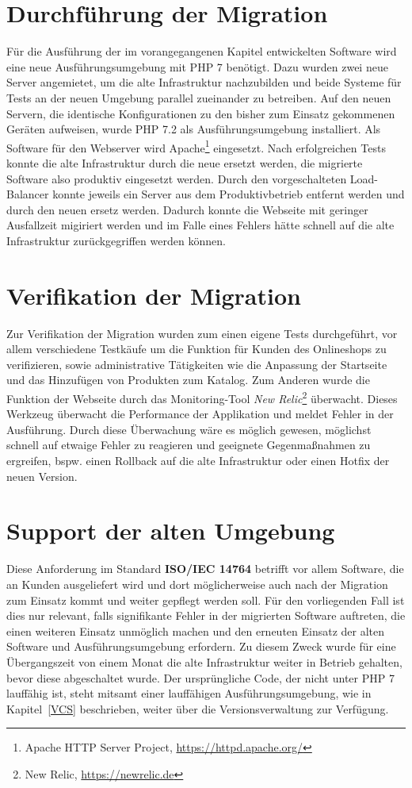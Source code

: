 \section{Durchführung der Migration}
Für die Ausführung der im vorangegangenen Kapitel entwickelten Software wird eine neue Ausführungsumgebung mit \ac{PHP} 7 benötigt. Dazu wurden zwei neue 
Server angemietet, um die alte Infrastruktur nachzubilden und beide Systeme für Tests an der neuen Umgebung parallel zueinander zu betreiben. Auf den neuen 
Servern, die identische Konfigurationen zu den bisher zum Einsatz gekommenen Geräten aufweisen, wurde \ac{PHP} 7.2 als Ausführungsumgebung installiert. 
Als Software für den Webserver wird Apache\footnote{Apache HTTP Server Project, \url{https://httpd.apache.org/}} eingesetzt. Nach erfolgreichen Tests konnte die 
alte Infrastruktur durch die neue ersetzt werden, die migrierte Software also produktiv eingesetzt werden. Durch den vorgeschalteten Load-Balancer konnte jeweils 
ein Server aus dem Produktivbetrieb entfernt werden und durch den neuen ersetz werden. Dadurch konnte die Webseite mit geringer Ausfallzeit migiriert werden und 
im Falle eines Fehlers hätte schnell auf die alte Infrastruktur zurückgegriffen werden können.

\section{Verifikation der Migration}\label{newrelic}
Zur Verifikation der Migration wurden zum einen eigene Tests durchgeführt, vor allem verschiedene Testkäufe um die Funktion für Kunden des Onlineshops zu verifizieren, 
sowie administrative Tätigkeiten wie die Anpassung der Startseite und das Hinzufügen von Produkten zum Katalog. Zum Anderen wurde die Funktion der Webseite durch das 
Monitoring-Tool \textit{New Relic}\footnote{New Relic, \url{https://newrelic.de}} überwacht. Dieses Werkzeug überwacht die Performance der Applikation und meldet Fehler 
in der Ausführung. Durch diese Überwachung wäre es möglich gewesen, möglichst schnell auf etwaige Fehler zu reagieren und geeignete 
Gegenmaßnahmen zu ergreifen, bspw. einen Rollback auf die alte Infrastruktur oder einen Hotfix der neuen Version.

\section{Support der alten Umgebung}
Diese Anforderung im Standard \textbf{ISO/IEC 14764} betrifft vor allem Software, die an Kunden ausgeliefert wird und dort möglicherweise auch nach der Migration 
zum Einsatz kommt und weiter gepflegt werden soll. Für den vorliegenden Fall ist dies nur relevant, falls signifikante Fehler in der migrierten Software auftreten, 
die einen weiteren Einsatz unmöglich machen und den erneuten Einsatz der alten Software und Ausführungsumgebung erfordern.
Zu diesem Zweck wurde für eine Übergangszeit von einem Monat die alte Infrastruktur weiter in Betrieb gehalten, bevor diese abgeschaltet wurde. Der ursprüngliche 
Code, der nicht unter \ac{PHP} 7 lauffähig ist, steht mitsamt einer lauffähigen Ausführungsumgebung, wie in Kapitel~\ref{VCS} beschrieben, weiter über die 
Versionsverwaltung zur Verfügung.